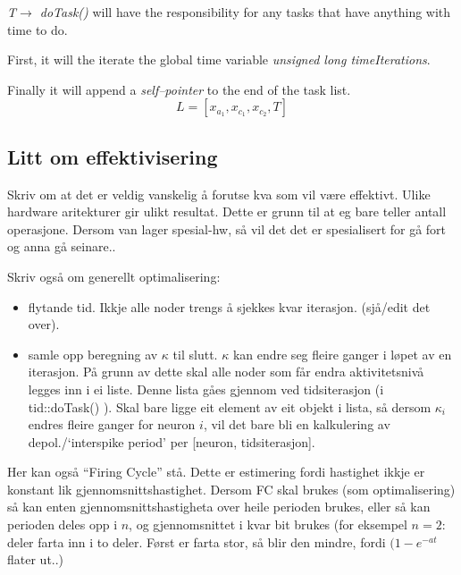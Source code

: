 \emph{T$\rightarrow$ doTask()} will have the responsibility for any tasks that have anything with time to do. 

First, it will the iterate the global time variable \emph{unsigned long timeIterations}.

Finally it will append a \emph{self--pointer} to the end of the task list.
\begin{equation}
	L = [x_{a_1}, x_{c_1}, x_{c_2}, T ]
\end{equation}


\subsection{Litt om effektivisering}
Skriv om at det er veldig vanskelig å forutse kva som vil være effektivt. Ulike hardware aritekturer gir  ulikt resultat. Dette er grunn til at eg bare teller antall operasjone. Dersom van lager spesial-hw, så vil det det er spesialisert for gå fort og anna gå seinare..

Skriv også om generellt optimalisering:
\begin{itemize}
	\item flytande tid. Ikkje alle noder trengs å sjekkes kvar iterasjon. (sjå/edit det over).
	\item samle opp beregning av $\kappa$ til slutt. $\kappa$ kan endre seg fleire ganger i løpet av en iterasjon. På grunn av dette skal alle noder som får endra aktivitetsnivå legges inn i ei liste. Denne lista gåes gjennom ved tidsiterasjon (i tid::doTask() ). Skal bare ligge eit element av eit objekt i lista, så dersom $\kappa_i$ endres fleire ganger for neuron $i$, vil det bare bli en kalkulering av depol./`interspike period' per [neuron, tidsiterasjon].
\end{itemize}

Her kan også ``Firing Cycle'' stå. Dette er estimering fordi hastighet ikkje er konstant lik gjennomsnittshastighet. Dersom FC skal brukes (som optimalisering) så kan enten gjennomsnittshastigheta over heile perioden brukes, eller så kan perioden deles opp i $n$, og gjennomsnittet i kvar bit brukes (for eksempel $n=2$: deler farta inn i to deler. Først er farta stor, så blir den mindre, fordi $(1-e^{-at}$ flater ut..)
